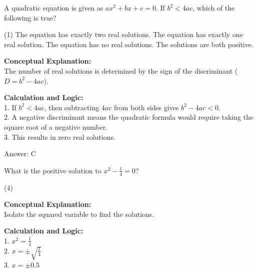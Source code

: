 \documentclass[11pt,paper=a4,answers]{exam}
\begin{document}
\begin{questions}
\vspace{30pt}

\question
A quadratic equation is given as $ax^2 + bx + c = 0$. If $b^2 < 4ac$, which of the following is true?
\begin{tasks}(1)
    \task The equation has exactly two real solutions.
    \task The equation has exactly one real solution.
    \task The equation has no real solutions.
    \task The solutions are both positive.
\end{tasks}

\begin{solution}
\textbf{Conceptual Explanation:} \\
The number of real solutions is determined by the sign of the discriminant ($D = b^2 - 4ac$).

\vspace{15pt}

\textbf{Calculation and Logic:} \\
1. If $b^2 < 4ac$, then subtracting $4ac$ from both sides gives $b^2 - 4ac < 0$. \\
2. A negative discriminant means the quadratic formula would require taking the square root of a negative number. \\
3. This results in zero real solutions.

\vspace{20pt}

Answer: \colorbox{yellow!100}{C}
\end{solution}

\vspace{30pt}

\question
What is the positive solution to $x^2 - \frac{1}{4} = 0$?
\begin{tasks}(4)
\end{tasks}

\begin{solution}
\textbf{Conceptual Explanation:} \\
Isolate the squared variable to find the solutions.

\vspace{15pt}

\textbf{Calculation and Logic:} \\
1. $x^2 = \frac{1}{4}$ \\
2. $x = \pm \sqrt{\frac{1}{4}}$ \\
3. $x = \pm 0.5$


\end{solution}
\end{questions}
\end{document}
